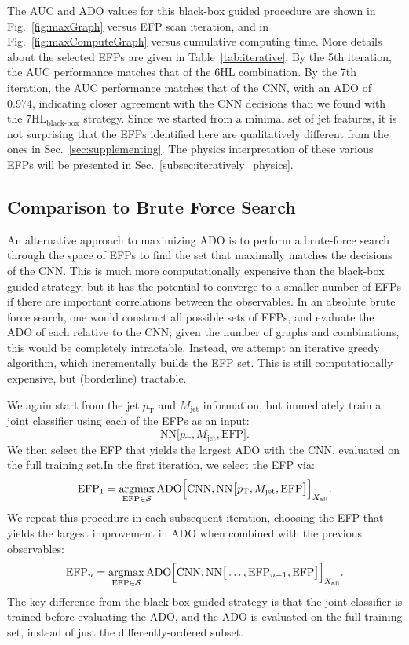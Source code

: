 \documentclass[aps,prd,twocolumn,superscriptaddress,preprintnumbers,nofootinbib,longbibliography,floatfix]{revtex4-1}
\newcommand{\CNN}{\text{CNN}}
\newcommand{\NN}{\text{NN}}
\newcommand{\HL}{\text{HL}}
\newcommand{\ADO}{\text{ADO}}
\newcommand{\EFP}{\text{EFP}}
\DeclareMathOperator*{\argmax}{argmax}
\newcommand{\Fig}[1]{Fig.~\ref{#1}}
\newcommand{\Tab}[1]{Table~\ref{#1}}
\newcommand{\Sec}[1]{Sec.~\ref{#1}}
\begin{document}
The AUC and ADO values for this black-box guided procedure are shown in \Fig{fig:maxGraph} versus EFP scan iteration, and in \Fig{fig:maxComputeGraph} versus cumulative computing time. More details about the selected EFPs are given in \Tab{tab:iterative}. By the 5th iteration, the AUC performance matches that of the 6HL combination. By the 7th iteration, the AUC performance matches that of the CNN, with an ADO of 0.974, indicating closer agreement with the CNN decisions than we found with the $7\HL_{\text{black-box}}$  strategy. Since we started from a minimal set of jet features, it is not surprising that the EFPs identified here are qualitatively different from the ones in \Sec{sec:supplementing}. The physics interpretation of these various EFPs will be presented in \Sec{subsec:iteratively_physics}.

\subsection{Comparison to Brute Force Search}
\label{subsec:iteratively_bruteforce}
An alternative approach to maximizing ADO is to perform a brute-force search through the space of EFPs to find the set that maximally matches the decisions of the CNN. This is much more computationally expensive than the black-box guided strategy, but it has the potential to converge to a smaller number of EFPs if there are important correlations between the observables. In an absolute brute force search, one would construct all possible sets of EFPs, and evaluate the ADO of each relative to the CNN; given the number of graphs and combinations, this would be completely intractable. Instead, we attempt an iterative greedy algorithm, which incrementally builds the EFP set. This is still computationally expensive, but (borderline) tractable.

We again start from the jet $p_{\textrm{T}}$ and $M_{\textrm{jet}}$ information, but immediately train a joint classifier using each of the EFPs as an input:
\begin{equation}
\NN\Big[p_{\textrm{T}}, M_{\textrm{jet}}, \EFP \Big].
\end{equation}
We then select the EFP that yields the largest ADO with the CNN, evaluated on the full training set.In the first iteration, we select the EFP via:
\begin{equation}
\EFP_1 = \argmax_{\EFP \in \mathcal{S}} \ADO\Big[\CNN, \NN\big[p_{\textrm{T}}, M_{\textrm{jet}}, \EFP \big]\Big]_{X_{\rm all}}.
\end{equation}
We repeat this procedure in each subsequent iteration, choosing the EFP that yields the largest improvement in ADO when combined with the previous observables:
\begin{equation}
\label{eq:bruteforcescan}
\EFP_n = \argmax_{\EFP \in \mathcal{S}} \ADO\Big[\CNN, \NN\big[\ldots, \EFP_{n-1}, \EFP \big]\Big]_{X_{\rm all}}.
\end{equation}
The key difference from the black-box guided strategy is that the joint classifier is trained before evaluating the ADO, and the ADO is evaluated on the full training set, instead of just the differently-ordered subset.
\end{document}
